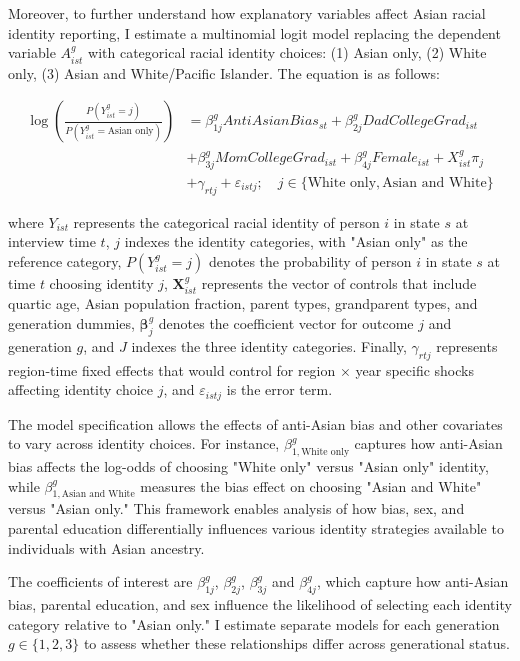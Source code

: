 Moreover, to further understand how explanatory variables affect Asian racial identity reporting, I estimate a multinomial logit model replacing the dependent variable $A_{ist}^g$ with categorical racial identity choices: (1) Asian only, (2) White only, (3) Asian and White/Pacific Islander. The equation is as follows:

\begin{align}
\log\left(\frac{P(Y_{ist}^g = j)}{P(Y_{ist}^g = \text{Asian only})}\right) &= \beta_{1j}^g AntiAsianBias_{st} + \beta_{2j}^g DadCollegeGrad_{ist}\nonumber \\ 
& + \beta_{3j}^g MomCollegeGrad_{ist} + \beta_{4j}^g Female_{ist} + X_{ist}^g\pi_j  \nonumber \\ 
& + \gamma_{rtj} + \varepsilon_{istj}; \quad j \in \{\text{White only}, \text{Asian and White}\} \label{eq:multinomial_logit}
\end{align}

where $Y_{ist}$ represents the categorical racial identity of person $i$ in state $s$ at interview time $t$, $j$ indexes the identity categories, with "Asian only" as the reference category, $P(Y_{ist}^g = j)$ denotes the probability of person $i$ in state $s$ at time $t$ choosing identity $j$, $\mathbf{X}_{ist}^g$ represents the vector of controls that include quartic age, Asian population fraction, parent types, grandparent types, and generation dummies, $\boldsymbol{\beta}_j^g$ denotes the coefficient vector for outcome $j$ and generation $g$, and $J$ indexes the three identity categories. Finally, $\gamma_{rtj}$ represents region-time fixed effects that would control for region $\times$ year specific shocks affecting identity choice $j$, and $\varepsilon_{istj}$ is the error term.

The model specification allows the effects of anti-Asian bias and other covariates to vary across identity choices. For instance, $\beta_{1,\text{White only}}^g$ captures how anti-Asian bias affects the log-odds of choosing "White only" versus "Asian only" identity, while $\beta_{1,\text{Asian and White}}^g$ measures the bias effect on choosing "Asian and White" versus "Asian only." This framework enables analysis of how bias, sex, and parental education differentially influences various identity strategies available to individuals with Asian ancestry.

The coefficients of interest are $\beta_{1j}^g$, $\beta_{2j}^g$, $\beta_{3j}^g$ and $\beta_{4j}^g$, which capture how anti-Asian bias, parental education, and sex influence the likelihood of selecting each identity category relative to "Asian only." I estimate separate models for each generation $g \in \{1,2,3\}$ to assess whether these relationships differ across generational status.

